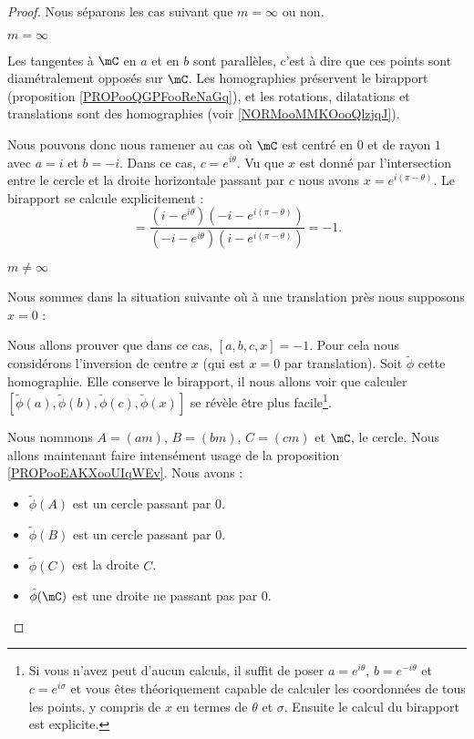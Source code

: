 \begin{proof}
    Nous séparons les cas suivant que \( m=\infty\) ou non.
    \begin{subproof}
        \item[\( m=\infty\)]

            Les tangentes à \( \mC\) en \( a\) et en \( b\) sont parallèles, c'est à dire que ces points sont diamétralement opposés sur \( \mC\). Les homographies préservent le birapport (proposition \ref{PROPooQGPFooReNaGq}), et les rotations, dilatations et translations sont des homographies (voir \ref{NORMooMMKOooQlzjqJ}).

            Nous pouvons donc nous ramener au cas où \( \mC\) est centré en \( 0\) et de rayon \( 1\) avec \( a=i\) et \( b=-i\). Dans ce cas, \( c= e^{i\theta}\). Vu que \( x\) est donné par l'intersection entre le cercle et la droite horizontale passant par \( c\) nous avons \( x= e^{i(\pi-\theta)}\). Le birapport se calcule explicitement :
            \begin{equation}
                [a,b,c,x]=\frac{ (i- e^{i\theta})(-i- e^{i(\pi-\theta)}) }{ (-i- e^{i\theta})(i- e^{i(\pi-\theta)}) }=-1.
            \end{equation}

        \item[\( m\neq\infty\)]

            Nous sommes dans la situation suivante où à une translation près nous supposons \( x=0\) :


            \begin{center}
                
            \end{center}

            Nous allons prouver que dans ce cas, \( [a,b,c,x]=-1\). Pour cela nous considérons l'inversion de centre \( x\) (qui est \( x=0\) par translation). Soit \( \tilde \phi\) cette homographie. Elle conserve le birapport, il nous allons voir que calculer \( [\tilde \phi(a),\tilde \phi(b),\tilde \phi(c),\tilde \phi(x)]\) se révèle être plus facile\footnote{Si vous n'avez peut d'aucun calculs, il suffit de poser \( a= e^{i\theta}\), \( b= e^{-i\theta}\) et \( c= e^{i\sigma}\) et vous êtes théoriquement capable de calculer les coordonnées de tous les points, y compris de \( x\) en termes de \( \theta\) et \( \sigma\). Ensuite le calcul du birapport est explicite.}.

            Nous nommons \( A=(am)\), \( B=(bm)\), \( C=(cm)\) et \( \mC\), le cercle. Nous allons maintenant faire intensément usage de la proposition \ref{PROPooEAKXooUIqWEv}. Nous avons :
            \begin{itemize}
                \item \( \tilde \phi(A)\) est un cercle passant par \( 0\).
                \item \( \tilde \phi(B)\) est un cercle passant par \( 0\).
                \item \( \tilde \phi(C)\) est la droite \( C\). 
                \item \( \tilde \phi(\mC)\) est une droite ne passant pas par \( 0\).
            \end{itemize}


\end{subproof}
\end{proof}
